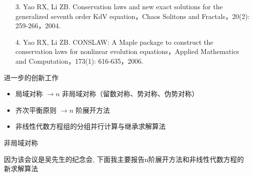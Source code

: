 \documentclass{beamer}
\begin{document}
\begin{frame}
 \begin{itemize}
  \item[3.] Yao RX, Li ZB. Conservation laws and new exact solutions for the generalized seventh order KdV equation，Chaos Solitons and Fractals，20(2): 259-266，2004.
  \item[4.] Yao RX, Li ZB. CONSLAW: A Maple package to construct the conservation laws for nonlinear evolution equations，Applied Mathematics and Computation，173(1): 616-635，2006.
 \end{itemize}
\end{frame}

\begin{frame}{进一步的创新工作}
     \begin{itemize}
      \item  局域对称 $\rightarrow n$ 非局域对称（留数对称、势对称、伪势对称）
      \item  齐次平衡原则 $\rightarrow n$ 阶展开方法
      \item  非线性代数方程组的分组并行计算与继承求解算法
    \end{itemize}
\end{frame}
\begin{frame}{非局域对称}


\end{frame}
\begin{frame}
因为该会议是吴先生的纪念会, 下面我主要报告n阶展开方法和非线性代数方程的新求解算法
\end{frame}


% 



\end{document}
